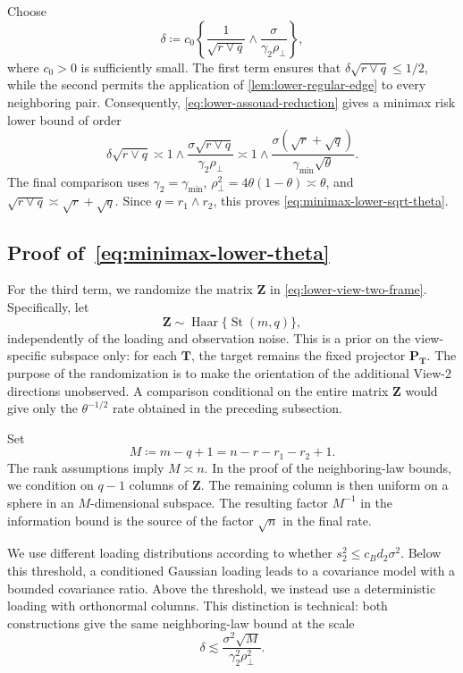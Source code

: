 \documentclass[11pt]{article}
\begin{document}
Choose
\[
  \delta
  \coloneqq
  c_0
  \left\{
    \frac1{\sqrt{r\vee q}}
    \wedge
    \frac{\sigma}{\gamma_2\rho_\perp}
  \right\},
\]
where $c_0>0$ is sufficiently small.  The first term ensures that
$\delta\sqrt{r\vee q}\le1/2$, while the second permits the application of
\cref{lem:lower-regular-edge} to every neighboring pair.  Consequently,
\cref{eq:lower-assouad-reduction} gives a minimax risk lower bound of order
\[
  \delta\sqrt{r\vee q}
  \asymp
  1\wedge
  \frac{
    \sigma\sqrt{r\vee q}
  }{
    \gamma_2\rho_\perp
  }
  \asymp
  1\wedge
  \frac{
    \sigma(\sqrt r+\sqrt q)
  }{
    \gamma_{\min}\sqrt\theta
  }.
\]
The final comparison uses
$\gamma_2=\gamma_{\min}$,
$\rho_\perp^2=4\theta(1-\theta)\asymp\theta$, and
$\sqrt{r\vee q}\asymp\sqrt r+\sqrt q$.  Since
$q=r_1\wedge r_2$, this proves
\cref{eq:minimax-lower-sqrt-theta}.


\subsection{Proof of~\cref{eq:minimax-lower-theta}}

For the third term, we randomize the matrix $\bm Z$ in
\cref{eq:lower-view-two-frame}.  Specifically, let
\[
  \bm Z
  \sim
  \operatorname{Haar}\{\operatorname{St}(m,q)\},
\]
independently of the loading and observation noise.  This is a prior on the
view-specific subspace only: for each $\bm T$, the target remains the fixed
projector $\bm P_{\bm T}$.  The purpose of the randomization is to make the
orientation of the additional View-2 directions unobserved.  A comparison
conditional on the entire matrix $\bm Z$ would give only the
$\theta^{-1/2}$ rate obtained in the preceding subsection.

Set
\[
  M
  \coloneqq
  m-q+1
  =
  n-r-r_1-r_2+1.
\]
The rank assumptions imply $M\asymp n$.  In the proof of the neighboring-law
bounds, we condition on $q-1$ columns of $\bm Z$.  The remaining column is
then uniform on a sphere in an $M$-dimensional subspace.  The resulting
factor $M^{-1}$ in the information bound is the source of the factor
$\sqrt n$ in the final rate.

We use different loading distributions according to whether
$s_2^2\le c_Bd_2\sigma^2$.  Below this threshold, a conditioned Gaussian
loading leads to a covariance model with a bounded covariance ratio.  Above
the threshold, we instead use a deterministic loading with orthonormal
columns.  This distinction is technical: both constructions give the same
neighboring-law bound at the scale
\[
  \delta
  \lesssim
  \frac{\sigma^2\sqrt M}
       {\gamma_2^2\rho_\perp^2}.
\]
\end{document}
